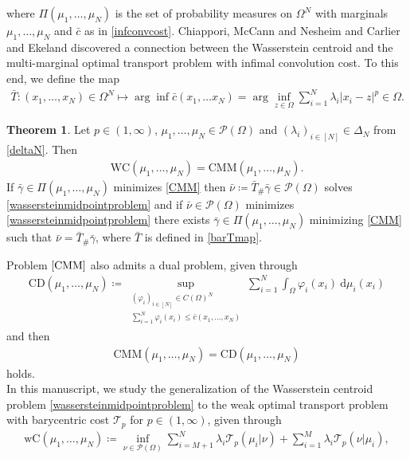 \documentclass[letterpaper]{amsart}
\newcommand{\dd}{\mathrm{d}}
\theoremstyle{definition}
\newtheorem{thm}{Theorem}[section]
\begin{document}
 where $\Pi(\mu_1,\dots,\mu_N)$ is the set of probability measures on $\Omega^N$ with marginals $\mu_1,\dots,\mu_N$ and $\bar c$ as in \eqref{infconvcost}.
Chiappori, McCann and Nesheim \cite{chiappori2010} and Carlier and Ekeland \cite{carlier2010} discovered a connection between the Wasserstein centroid and the multi-marginal optimal transport problem with infimal convolution cost. To this end, we define the map
\begin{gather}\label{barTmap}
	\bar T:
		(x_1,\dots,x_N)\in\Omega^N\mapsto \arg\inf\bar c(x_1,\dots x_N)=\arg\inf\limits_{z\in\Omega}\sum\limits_{i=1}^N\lambda_i|x_i-z|^p\in\Omega.
\end{gather}
\begin{thm}\cite[Sec 5]{chiappori2010}\cite[Prop 3]{carlier2010}\label{chiapporithm}
	Let $p\in(1,\infty)$, $\mu_1,\dots,\mu_N\in\mathcal P(\Omega)$ and $(\lambda_i)_{i\in[N]}\in\Delta_N$ from \eqref{deltaN}. Then
	\begin{gather*}
		\text{WC}(\mu_1,\dots,\mu_N)=\text{CMM}(\mu_1,\dots,\mu_N).
	\end{gather*}
	If $\bar\gamma\in\Pi(\mu_1,\dots,\mu_N)$ minimizes \eqref{CMM} then $\bar\nu\coloneqq\bar T_{\#}\bar\gamma\in\mathcal P(\Omega)$ solves \eqref{wassersteinmidpointproblem} and if $\bar\nu\in\mathcal P(\Omega)$ minimizes \eqref{wassersteinmidpointproblem} there exists $\bar\gamma\in\Pi(\mu_1,\dots,\mu_N)$ minimizing \eqref{CMM} such that $\bar\nu=\bar T_{\#}\bar\gamma$, where $\bar T$ is defined in \eqref{barTmap}.
\end{thm}
Problem $\eqref{CMM}$ also admits a dual problem, given through
\begin{gather}\label{CD}
	\text{CD}(\mu_1,\dots,\mu_N)\coloneqq \sup_{\substack{(\varphi_i)_{i\in[N]}\in C(\Omega)^N\\
	\sum_{i=1}^N\varphi_i(x_i)\leq \bar c(x_1,\dots,x_N)	
}}\sum_{i=1}^N\int_\Omega\varphi_i(x_i)\ \dd\mu_i(x_i)
\end{gather}
and then
\begin{gather*}
	\text{CMM}(\mu_1,\dots,\mu_N)=\text{CD}(\mu_1,\dots,\mu_N)
\end{gather*}
holds.\\
In this manuscript, we study the generalization of the Wasserstein centroid problem \eqref{wassersteinmidpointproblem} to the weak optimal transport problem with barycentric cost $\mathcal T_p$ for $p\in(1,\infty)$, given through
\begin{gather}\label{weakmidpointproblem}
	\text{wC}(\mu_1,\dots,\mu_N)\coloneqq\inf_{\nu\in\mathcal P(\Omega)}\sum_{i=M+1}^N\mathcal \lambda_i \mathcal T_p(\mu_i|\nu)+\sum_{i=1}^M\lambda_i\mathcal T_p(\nu|\mu_i),
\end{gather}
\end{document}
